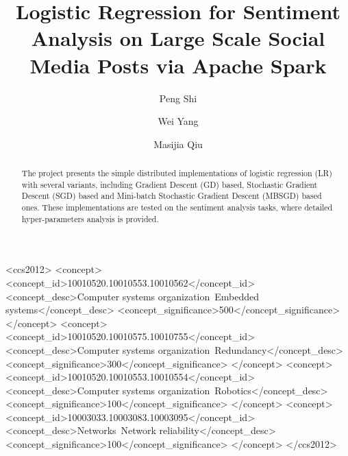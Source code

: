 \documentclass[sigconf]{acmart}
\begin{document}
\title{Logistic Regression for Sentiment Analysis on Large Scale Social Media Posts via Apache Spark}


\author{Peng Shi}

\author{Wei Yang}

\author{Masijia Qiu}




\begin{abstract}

The project presents the simple distributed implementations of logistic regression (LR) with several variants, including Gradient Descent (GD) based, Stochastic Gradient Descent (SGD) based and Mini-batch Stochastic Gradient Descent (MBSGD) based ones. These implementations are tested on the sentiment analysis tasks, where detailed hyper-parameters analysis is provided. 

\end{abstract}
%
%
\begin{CCSXML}
<ccs2012>
 <concept>
  <concept_id>10010520.10010553.10010562</concept_id>
  <concept_desc>Computer systems organization~Embedded systems</concept_desc>
  <concept_significance>500</concept_significance>
 </concept>
 <concept>
  <concept_id>10010520.10010575.10010755</concept_id>
  <concept_desc>Computer systems organization~Redundancy</concept_desc>
  <concept_significance>300</concept_significance>
 </concept>
 <concept>
  <concept_id>10010520.10010553.10010554</concept_id>
  <concept_desc>Computer systems organization~Robotics</concept_desc>
  <concept_significance>100</concept_significance>
 </concept>
 <concept>
  <concept_id>10003033.10003083.10003095</concept_id>
  <concept_desc>Networks~Network reliability</concept_desc>
  <concept_significance>100</concept_significance>
 </concept>
</ccs2012>
\end{CCSXML}



\end{document}
